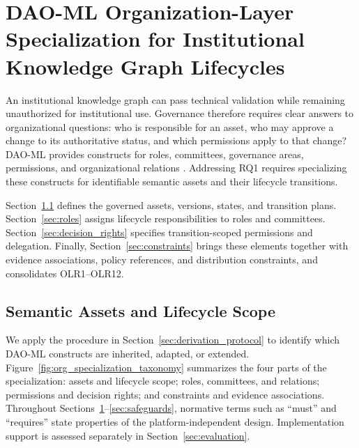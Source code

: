 \documentclass[journal]{IEEEtran}
\begin{document}
\section{DAO-ML Organization-Layer Specialization for Institutional Knowledge Graph Lifecycles}
\label{sec:governance_requirements}

An institutional knowledge graph can pass technical validation
while remaining unauthorized for institutional use. Governance
therefore requires clear answers to organizational questions:
who is responsible for an asset, who may approve a change to
its authoritative status, and which permissions apply to that
change? DAO-ML provides constructs for roles, committees,
governance areas, permissions, and organizational relations
\cite{Avanzo2024DAOML,Avanzo2025DAOMod}. Addressing RQ1 requires
specializing these constructs for identifiable semantic assets
and their lifecycle transitions.

Section~\ref{sec:lifecycle} defines the governed assets,
versions, states, and transition plans.
Section~\ref{sec:roles} assigns lifecycle responsibilities to
roles and committees. Section~\ref{sec:decision_rights}
specifies transition-scoped permissions and delegation.
Finally, Section~\ref{sec:constraints} brings these elements together
with evidence associations, policy references, and distribution
constraints, and consolidates OLR1--OLR12.

\subsection{Semantic Assets and Lifecycle Scope}
\label{sec:lifecycle}

We apply the procedure in Section~\ref{sec:derivation_protocol}
to identify which DAO-ML constructs are inherited, adapted,
or extended. Figure~\ref{fig:org_specialization_taxonomy}
summarizes the four parts of the specialization: assets and
lifecycle scope; roles, committees, and relations; permissions
and decision rights; and constraints and evidence associations.
Throughout Sections~\ref{sec:governance_requirements}--\ref{sec:safeguards},
normative terms such as ``must'' and ``requires'' state properties
of the platform-independent design. Implementation support
is assessed separately in Section~\ref{sec:evaluation}.
\end{document}
